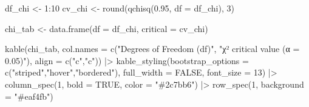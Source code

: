 \documentclass[
  12pt,
  letterpaper,
]{book}
\newenvironment{Shaded}{\begin{snugshade}}{\end{snugshade}}
\newcommand{\AttributeTok}[1]{\textcolor[rgb]{0.40,0.45,0.13}{#1}}
\newcommand{\ConstantTok}[1]{\textcolor[rgb]{0.56,0.35,0.01}{#1}}
\newcommand{\DecValTok}[1]{\textcolor[rgb]{0.68,0.00,0.00}{#1}}
\newcommand{\FloatTok}[1]{\textcolor[rgb]{0.68,0.00,0.00}{#1}}
\newcommand{\FunctionTok}[1]{\textcolor[rgb]{0.28,0.35,0.67}{#1}}
\newcommand{\NormalTok}[1]{\textcolor[rgb]{0.00,0.23,0.31}{#1}}
\newcommand{\OtherTok}[1]{\textcolor[rgb]{0.00,0.23,0.31}{#1}}
\newcommand{\SpecialCharTok}[1]{\textcolor[rgb]{0.37,0.37,0.37}{#1}}
\newcommand{\StringTok}[1]{\textcolor[rgb]{0.13,0.47,0.30}{#1}}
\begin{document}
\begin{Shaded}
\begin{Highlighting}[]
\NormalTok{df\_chi  }\OtherTok{\textless{}{-}} \DecValTok{1}\SpecialCharTok{:}\DecValTok{10}
\NormalTok{cv\_chi  }\OtherTok{\textless{}{-}} \FunctionTok{round}\NormalTok{(}\FunctionTok{qchisq}\NormalTok{(}\FloatTok{0.95}\NormalTok{, }\AttributeTok{df =}\NormalTok{ df\_chi), }\DecValTok{3}\NormalTok{)}

\NormalTok{chi\_tab }\OtherTok{\textless{}{-}} \FunctionTok{data.frame}\NormalTok{(}\AttributeTok{df =}\NormalTok{ df\_chi, }\AttributeTok{critical =}\NormalTok{ cv\_chi)}

\FunctionTok{kable}\NormalTok{(chi\_tab, }\AttributeTok{col.names =} \FunctionTok{c}\NormalTok{(}\StringTok{"Degrees of Freedom (df)"}\NormalTok{, }\StringTok{"χ² critical value (α = 0.05)"}\NormalTok{),}
      \AttributeTok{align =} \FunctionTok{c}\NormalTok{(}\StringTok{"c"}\NormalTok{,}\StringTok{"c"}\NormalTok{)) }\SpecialCharTok{|\textgreater{}}
  \FunctionTok{kable\_styling}\NormalTok{(}\AttributeTok{bootstrap\_options =} \FunctionTok{c}\NormalTok{(}\StringTok{"striped"}\NormalTok{,}\StringTok{"hover"}\NormalTok{,}\StringTok{"bordered"}\NormalTok{),}
                \AttributeTok{full\_width =} \ConstantTok{FALSE}\NormalTok{, }\AttributeTok{font\_size =} \DecValTok{13}\NormalTok{) }\SpecialCharTok{|\textgreater{}}
  \FunctionTok{column\_spec}\NormalTok{(}\DecValTok{1}\NormalTok{, }\AttributeTok{bold =} \ConstantTok{TRUE}\NormalTok{, }\AttributeTok{color =} \StringTok{"\#2c7bb6"}\NormalTok{) }\SpecialCharTok{|\textgreater{}}
  \FunctionTok{row\_spec}\NormalTok{(}\DecValTok{1}\NormalTok{, }\AttributeTok{background =} \StringTok{"\#eaf4fb"}\NormalTok{)}
\end{Highlighting}
\end{Shaded}

\begingroup\fontsize{13}{15}\selectfont
\end{document}
